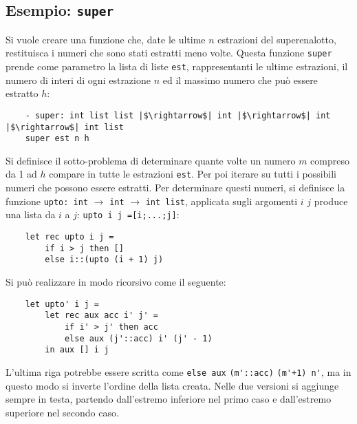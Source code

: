 \documentclass{article}
\numberwithin{equation}{subsection}
\begin{document}
\subsection{Esempio: \texttt{super}}

Si vuole creare una funzione che, date le ultime $n$ estrazioni del superenalotto, restituisca i numeri che sono stati estratti meno volte. Questa funzione \verb|super| prende come parametro la lista di liste \verb|est|, rappresentanti le ultime estrazioni, il numero di interi di ogni estrazione $n$ ed il massimo numero che può essere estratto $h$:
\begin{verbatim}
    - super: int list list |$\rightarrow$| int |$\rightarrow$| int |$\rightarrow$| int list
    super est n h
\end{verbatim}
Si definisce il sotto-problema di determinare quante volte un numero $m$ compreso da 1 ad $h$ compare in tutte le estrazioni \verb|est|. Per poi iterare su tutti i possibili numeri che possono essere estratti. 
Per determinare questi numeri, si definisce la funzione \verb|upto: int| $\rightarrow$ \verb|int| $\rightarrow$ \verb|int list|, applicata sugli argomenti $i$ $j$ produce una lista da $i$ a $j$: \verb|upto i j =[i;...;j]|:
\begin{verbatim}
    let rec upto i j =
        if i > j then []
        else i::(upto (i + 1) j)    
\end{verbatim}
Si può realizzare in modo ricorsivo come il seguente:
\begin{verbatim}
    let upto' i j =
        let rec aux acc i' j' =
            if i' > j' then acc
            else aux (j'::acc) i' (j' - 1)
        in aux [] i j
\end{verbatim}
L'ultima riga potrebbe essere scritta come \verb|else aux| \verb|(m'::acc)| \verb|(m'+1) n'|, ma in questo modo si inverte l'ordine della lista creata. Nelle due versioni si aggiunge sempre in testa, partendo dall'estremo inferiore nel primo caso e dall'estremo superiore nel secondo caso. 
\end{document}
